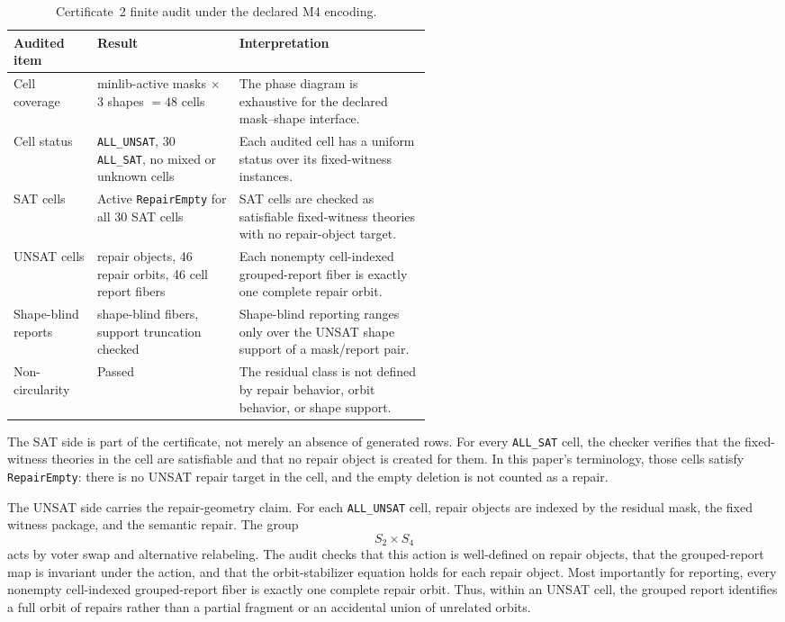 \begin{table}[t]
\centering
\small
\begin{tabularx}{\linewidth}{@{}>{\raggedright\arraybackslash}p{0.20\linewidth}>{\raggedright\arraybackslash}p{0.34\linewidth}>{\raggedright\arraybackslash}X@{}}
\toprule
Audited item & Result & Interpretation \\
\midrule
Cell coverage
  & 16 minlib-active masks \(\times\) 3 shapes \(=48\) cells
  & The phase diagram is exhaustive for the declared mask--shape interface. \\
Cell status
  & 18 \texttt{ALL\_UNSAT}, 30 \texttt{ALL\_SAT}, no mixed or unknown cells
  & Each audited cell has a uniform status over its fixed-witness instances. \\
SAT cells
  & Active \texttt{RepairEmpty} for all 30 SAT cells
  & SAT cells are checked as satisfiable fixed-witness theories with no repair-object target. \\
UNSAT cells
  & 816 repair objects, 46 repair orbits, 46 cell report fibers
  & Each nonempty cell-indexed grouped-report fiber is exactly one complete repair orbit. \\
Shape-blind reports
  & 33 shape-blind fibers, support truncation checked
  & Shape-blind reporting ranges only over the UNSAT shape support of a mask/report pair. \\
Non-circularity
  & Passed
  & The residual class is not defined by repair behavior, orbit behavior, or shape support. \\
\bottomrule
\end{tabularx}
\caption{Certificate~2 finite audit under the declared M4 encoding.}
\label{tab:m4-finite-audit}
\end{table}

The SAT side is part of the certificate, not merely an absence of generated
rows. For every \texttt{ALL\_SAT} cell, the checker verifies that the
fixed-witness theories in the cell are satisfiable and that no repair object is
created for them. In this paper's terminology, those cells satisfy
\texttt{RepairEmpty}: there is no UNSAT repair target in the cell, and the
empty deletion is not counted as a repair.

The UNSAT side carries the repair-geometry claim. For each
\texttt{ALL\_UNSAT} cell, repair objects are indexed by the residual mask,
the fixed witness package, and the semantic repair. The group
\[
  S_2 \times S_4
\]
acts by voter swap and alternative relabeling. The audit checks that this
action is well-defined on repair objects, that the grouped-report map is
invariant under the action, and that the orbit-stabilizer equation holds for
each repair object. Most importantly for reporting, every nonempty
cell-indexed grouped-report fiber is exactly one complete repair orbit. Thus,
within an UNSAT cell, the grouped report identifies a full orbit of repairs
rather than a partial fragment or an accidental union of unrelated orbits.

